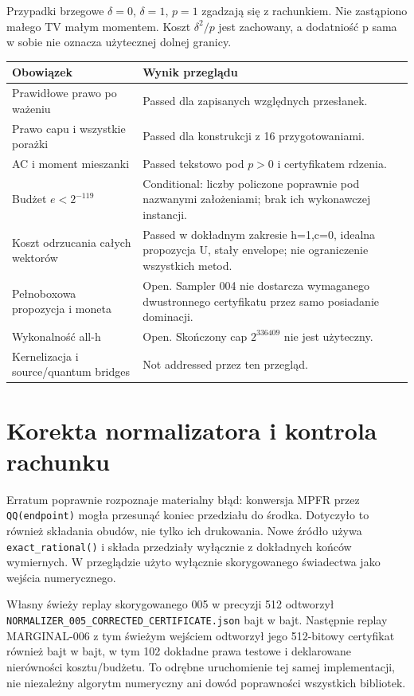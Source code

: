 \documentclass[11pt,a4paper]{article}
\newcommand{\code}[1]{\nolinkurl{#1}}
\begin{document}
Przypadki brzegowe $\delta=0$, $\delta=1$, $p=1$ zgadzają się z rachunkiem.
Nie zastąpiono małego TV małym momentem. Koszt $\delta^2/p$ jest zachowany,
a dodatniość p sama w sobie nie oznacza użytecznej dolnej granicy.

\small
\begin{longtable}{@{}p{.44\linewidth}p{.48\linewidth}@{}}
\toprule Obowiązek & Wynik przeglądu \\\midrule\endhead
Prawidłowe prawo po ważeniu & Passed dla zapisanych względnych przesłanek.\\
Prawo capu i wszystkie porażki & Passed dla konstrukcji z 16 przygotowaniami.\\
AC i moment mieszanki & Passed tekstowo pod $p>0$ i certyfikatem rdzenia.\\
Budżet $e<2^{-119}$ & Conditional: liczby policzone poprawnie pod nazwanymi
założeniami; brak ich wykonawczej instancji.\\
Koszt odrzucania całych wektorów & Passed w dokładnym zakresie h=1,c=0,
idealna propozycja U, stały envelope; nie ograniczenie wszystkich metod.\\
Pełnoboxowa propozycja i moneta & Open. Sampler 004 nie dostarcza
wymaganego dwustronnego certyfikatu przez samo posiadanie dominacji.\\
Wykonalność all-h & Open. Skończony cap $2^{336409}$ nie jest użyteczny.\\
Kernelizacja i source/quantum bridges & Not addressed przez ten przegląd.\\
\bottomrule\end{longtable}\normalsize

\section{Korekta normalizatora i kontrola rachunku}
Erratum poprawnie rozpoznaje materialny błąd: konwersja MPFR przez
\code{QQ(endpoint)} mogła przesunąć koniec przedziału do środka.
Dotyczyło to również składania obudów, nie tylko ich drukowania.
Nowe źródło używa \code{exact_rational()} i składa przedziały wyłącznie
z dokładnych końców wymiernych. W przeglądzie użyto wyłącznie
skorygowanego świadectwa jako wejścia numerycznego.

Własny świeży replay skorygowanego 005 w precyzji 512 odtworzył
\code{NORMALIZER_005_CORRECTED_CERTIFICATE.json} bajt w bajt.
Następnie replay MARGINAL-006 z tym świeżym wejściem odtworzył jego
512-bitowy certyfikat również bajt w bajt, w tym 102 dokładne prawa
testowe i deklarowane nierówności kosztu/budżetu.
To odrębne uruchomienie tej samej implementacji, nie niezależny algorytm
numeryczny ani dowód poprawności wszystkich bibliotek.
\end{document}
